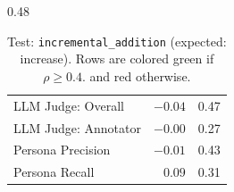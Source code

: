 \begin{table}[htbp]
\begin{subtable}[t]{0.48\textwidth}
\begin{tabular}{lrr}
\rowcolor{matchFalse} LLM Judge: Overall                    &  $-0.04$ &  0.47 \\
\rowcolor{matchFalse} LLM Judge: Annotator        &  $-0.00$ &  0.27 \\
\rowcolor{matchFalse} Persona Precision                     &  $-0.01$ &  0.43 \\
\rowcolor{matchFalse} Persona Recall                        &   $0.09$ &  0.31 \\
\bottomrule
\end{tabular}
\caption{LLM metrics}
\end{subtable}
\caption[Test: \texttt{incremental\_addition} (expected: increase).]{Test: \texttt{incremental\_addition} (expected: increase). Rows are colored green if $\rho\geq0.4$. and red otherwise.}
\label{tab:incremental_addition}
\end{table}



